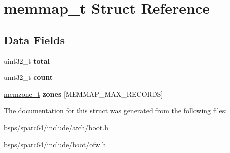 \hypertarget{structmemmap__t}{}\section{memmap\+\_\+t Struct Reference}
\label{structmemmap__t}
\subsection*{Data Fields}
\begin{DoxyCompactItemize}
\item 
\mbox{\label{structmemmap__t_a51aa997dc543625fdf483aba0a4bf255}} 
uint32\+\_\+t {\bfseries total}
\item 
\mbox{\label{structmemmap__t_a887d13fdc2d4737204154f703abadb4f}} 
uint32\+\_\+t {\bfseries count}
\item 
\mbox{\label{structmemmap__t_a729992ffa77e2df9077708546e4af9d8}} 
\mbox{\hyperlink{structmemzone__t}{memzone\+\_\+t}} {\bfseries zones} \mbox{[}M\+E\+M\+M\+A\+P\+\_\+\+M\+A\+X\+\_\+\+R\+E\+C\+O\+R\+DS\mbox{]}
\end{DoxyCompactItemize}


The documentation for this struct was generated from the following files\+:\begin{DoxyCompactItemize}
\item 
bsps/sparc64/include/arch/\mbox{\hyperlink{sparc64_2include_2arch_2boot_8h}{boot.\+h}}\item 
bsps/sparc64/include/boot/ofw.\+h\end{DoxyCompactItemize}
